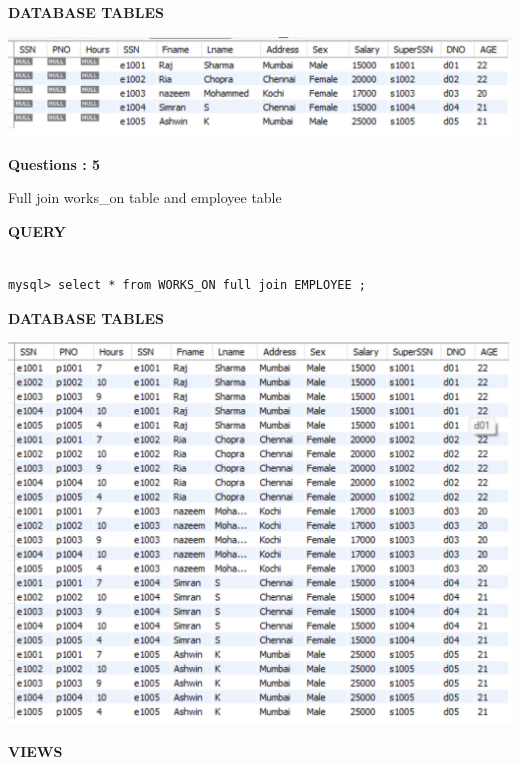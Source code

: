 \documentclass[a4paper,12pt]{report}
\begin{document}
\begin{flushleft}
		\textbf{DATABASE TABLES} 
\end{flushleft} 

\includegraphics[scale=1]{NQ4.png}

\begin{flushleft}
    \textbf{Questions : 5}
\end{flushleft}

Full join works\_on table and employee table

	\begin{flushleft}
		\textbf{QUERY }
	\end{flushleft}
 \begin{verbatim}
 
mysql> select * from WORKS_ON full join EMPLOYEE ;

 \end{verbatim}
\begin{flushleft}
		\textbf{DATABASE TABLES} 
\end{flushleft} 

\includegraphics[scale=0.9]{NQ5.png}
\newpage
\begin{center}
		\large\textbf{VIEWS}
	\end{center}
	
\end{document}
